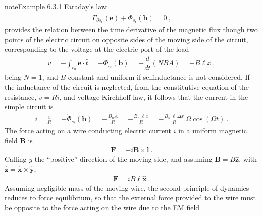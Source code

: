 \documentclass[letterpaper,10pt,english]{jupyterBook}
\begin{document}
\begin{sphinxadmonition}{note}{Example 6.3.1}
\sphinxAtStartPar
{} Faraday’s law
\begin{equation*}
\begin{split}\Gamma_{\partial s_t}(\mathbf{e}) + \dot{\Phi}_{s_t}(\mathbf{b}) = 0 \ ,\end{split}
\end{equation*}
\sphinxAtStartPar
provides the relation between the time derivative of the magnetic flux though two points of the electric circuit on opposite sides of the moving side of the circuit, corresponding to the voltage at the electric port of the load
\begin{equation*}
\begin{split}v = - \int_{\ell_0} \mathbf{e} \cdot \hat{t} = - \dot{\Phi}_{s_t}(\mathbf{b}) = - \dfrac{d}{dt} \left( N B A \right) = - B \ell \dot{x} \ ,\end{split}
\end{equation*}
\sphinxAtStartPar
being \(N = 1\), and \(B\) constant and uniform if self\sphinxhyphen{}inductance is not considered.
If the inductance of the circuit is neglected, from the constitutive equation of the resistance, \(v = R i\), and voltage Kirchhoff law, it follows that the current in the simple circuit is
\begin{equation*}
\begin{split}i = \frac{v}{R} = - \dot{\Phi}_{s_t}(\mathbf{b}) = - \frac{B_n \dot{A}}{R} = - \frac{B_n \, \ell \dot{x}}{R} = - \frac{B_n \, \ell \, \Delta x}{R} \, \Omega \cos(\Omega t) \ .\end{split}
\end{equation*}
\sphinxAtStartPar
The force acting on a wire conducting electric current \(i\) in a uniform magnetic field \(\mathbf{B}\) is
\begin{equation*}
\begin{split}\mathbf{F} = - i \mathbf{B} \times \mathbf{l} \ .\end{split}
\end{equation*}
\sphinxAtStartPar
Calling \(y\) the “positive” direction of the moving side, and assuming \(\mathbf{B} = B \hat{\mathbf{z}}\), with \(\hat{\mathbf{z}} = \hat{\mathbf{x}} \times \hat{\mathbf{y}}\),
\begin{equation*}
\begin{split}\mathbf{F} = i B \ell \hat{\mathbf{x}} \ .\end{split}
\end{equation*}
\sphinxAtStartPar
Assuming negligible mass of the moving wire, the second principle of dynamics reduces to force equilibrium, so that the external force provided to the wire must be opposite to the force acting on the wire due to the EM field

\end{sphinxadmonition}
\end{document}
